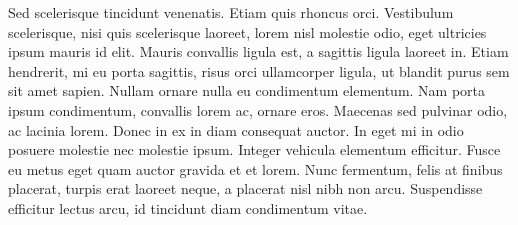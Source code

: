 \documentclass[12pt]{article}
\begin{document}
Sed scelerisque tincidunt venenatis. Etiam quis rhoncus orci. Vestibulum scelerisque, nisi quis scelerisque laoreet, lorem nisl molestie odio, eget ultricies ipsum mauris id elit. Mauris convallis ligula est, a sagittis ligula laoreet in. Etiam hendrerit, mi eu porta sagittis, risus orci ullamcorper ligula, ut blandit purus sem sit amet sapien. Nullam ornare nulla eu condimentum elementum. Nam porta ipsum condimentum, convallis lorem ac, ornare eros. Maecenas sed pulvinar odio, ac lacinia lorem. Donec in ex in diam consequat auctor. In eget mi in odio posuere molestie nec molestie ipsum. Integer vehicula elementum efficitur. Fusce eu metus eget quam auctor gravida et et lorem. Nunc fermentum, felis at finibus placerat, turpis erat laoreet neque, a placerat nisl nibh non arcu. Suspendisse efficitur lectus arcu, id tincidunt diam condimentum vitae. 
\end{document}
